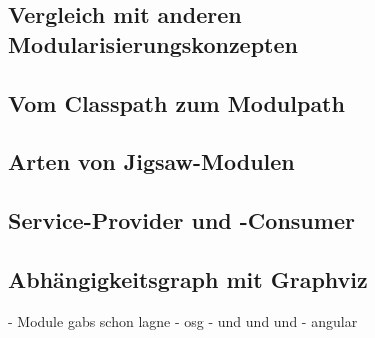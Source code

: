 \subsection{Vergleich mit anderen Modularisierungskonzepten}

\subsection{Vom Classpath zum Modulpath}

\subsection{Arten von Jigsaw-Modulen}

\subsection{Service-Provider und -Consumer}

\subsection{Abhängigkeitsgraph mit Graphviz}


- Module gabs schon lagne 
- osg 
- und und und 
- angular 